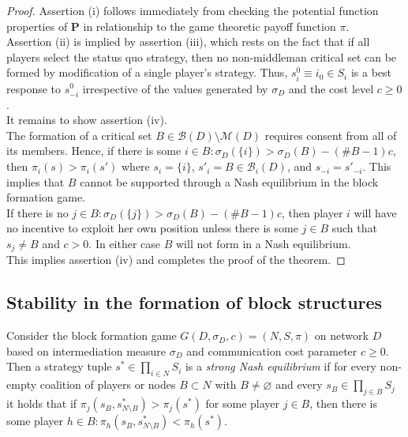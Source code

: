 \begin{proof}
Assertion (i) follows immediately from checking the potential function properties of $\mathbf{P}$ in relationship to the game theoretic payoff function $\pi$.
\\[1ex]
Assertion (ii) is implied by assertion (iii), which rests on the fact that if all players select the status quo strategy, then no non-middleman critical set can be formed by modification of a single player's strategy. Thus, $s^0_i \equiv i_0 \in S_i$ is a best response to $s^0_{-i}$ irrespective of the values generated by $\sigma_D$ and the cost level $c \geqslant 0$.
\\[1ex]
It remains to show assertion (iv).
\\
The formation of a critical set $B \in \mathcal{B} (D) \setminus \mathcal{M} (D)$ requires consent from all of its members. Hence, if there is some $i \in B \colon \sigma_D (\{ i \}) > \sigma_D (B) - (\# B -1)c$, then $\pi_{i}(s) > \pi_{i}(s')$ where $s_{i} = \{ i \}$, $s'_{i} = B \in \mathcal{B}_i (D)$, and $s_{-i} = s'_{-i}$. This implies that $B$ cannot be supported through a Nash equilibrium in the block formation game.
\\
If there is no $j \in B \colon \sigma_D (\{ j \}) > \sigma_D (B) - (\# B -1)c$, then player $i$ will have no incentive to exploit her own position unless there is some $j \in B$ such that $s_{j} \neq B$ and $c > 0$. In either case $B$ will not form in a Nash equilibrium.
\\
This implies assertion (iv) and completes the proof of the theorem.
\end{proof}

\subsection{Stability in the formation of block structures}

Consider the block formation game $G (D, \sigma_D ,c) = (N,S, \pi )$ on network $D$ based on intermediation measure $\sigma_D$ and communication cost parameter $c \geqslant 0$. Then a strategy tuple $s^* \in \prod_{i \in N} S_i$ is a \emph{strong Nash equilibrium} \citep{Aumann1959} if for every non-empty coalition of players or nodes $B \subset N$ with $B \neq \varnothing$ and every $s_B \in \prod_{j \in B} S_j$ it holds that if $\pi_j (s_B, s^*_{N \setminus B}) > \pi_j (s^*)$ for some player $j \in B$, then there is some player $h \in B \colon \pi_h (s_B, s^*_{N \setminus B}) < \pi_h (s^*)$.

